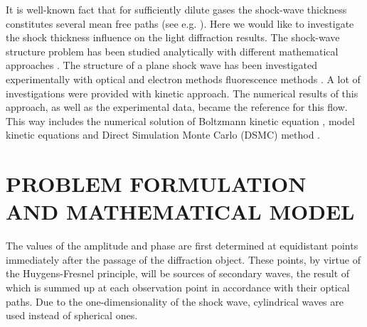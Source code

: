 \documentclass[letterpaper,11pt,oneside,reqno]{amsart}
\numberwithin{equation}{section}
\theoremstyle{definition}
\theoremstyle{qqq}
\begin{document}
It is well-known fact that for sufficiently dilute gases the shock-wave thickness constitutes several mean free paths (see e.g. \cite{Kogan, Cercignani_book}). Here we would like to investigate the shock thickness influence on the light diffraction results. The shock-wave structure problem has been studied analytically with different mathematical approaches \cite{Becker_1922, Mott-Smith_1951, Salwen_1964, Holway_1964, Yen_1966}. The structure of a plane shock wave has been investigated experimentally with optical and electron methods fluorescence methods \cite{Hornig_1950, Hansen_Hornig_1960, Robben, Alsmeyer_1976, Pham-Van-Diep624}. A lot of investigations were provided with kinetic approach. The numerical results of this approach, as well as the experimental data, became the reference for this flow. This way includes the numerical solution of Boltzmann kinetic equation  \citep{Ohwada_shock, Dodulad_Tcheremissine_2013, ShockWaves_2015}, model kinetic equations \citep{Shakhov, Rykov2008} and Direct Simulation Monte Carlo (DSMC) method \citep{Belotserkovskii, Pham-Van-Diep624, Erofeev_Friedlander_overshoot_2002, overshoot_2015}.

\section{PROBLEM FORMULATION AND MATHEMATICAL MODEL}

The values of the amplitude and phase are first determined at equidistant points immediately after the passage of the diffraction object. These points, by virtue of the Huygens-Fresnel principle, will be sources of secondary waves, the result of which is summed up at each observation point in accordance with their optical paths. Due to the one-dimensionality of the shock wave, cylindrical waves are used instead of spherical ones.
\end{document}
